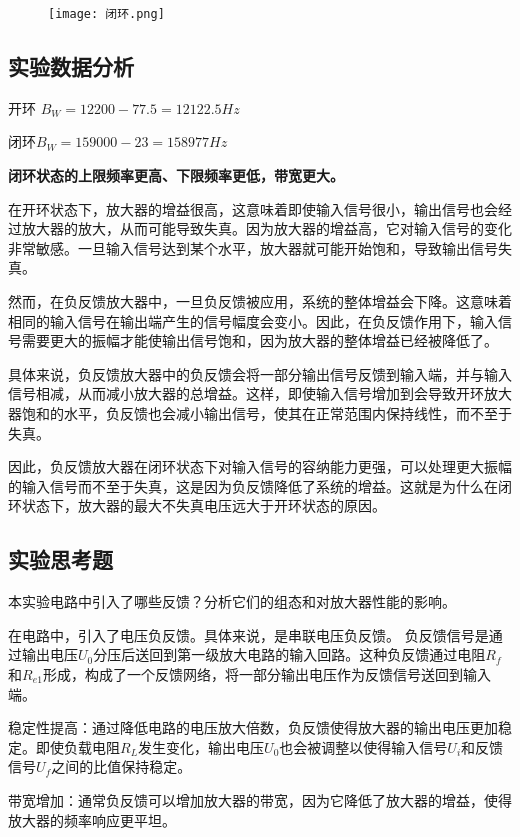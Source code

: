 \documentclass[dvipsnames, svgnames,a4paper,11pt]{article}
\begin{document}
	\begin{figure}[{H}]
		\centering
		\texttt{[image: 闭环.png]}
		
		\label{}
	\end{figure}
	\subsection{实验数据分析}
	开环 $B_W=12200-77.5=12122.5Hz$

闭环$B_W=159000-23=158977Hz$

\textbf{闭环状态的上限频率更高、下限频率更低，带宽更大。
}

在开环状态下，放大器的增益很高，这意味着即使输入信号很小，输出信号也会经过放大器的放大，从而可能导致失真。因为放大器的增益高，它对输入信号的变化非常敏感。一旦输入信号达到某个水平，放大器就可能开始饱和，导致输出信号失真。

然而，在负反馈放大器中，一旦负反馈被应用，系统的整体增益会下降。这意味着相同的输入信号在输出端产生的信号幅度会变小。因此，在负反馈作用下，输入信号需要更大的振幅才能使输出信号饱和，因为放大器的整体增益已经被降低了。

具体来说，负反馈放大器中的负反馈会将一部分输出信号反馈到输入端，并与输入信号相减，从而减小放大器的总增益。这样，即使输入信号增加到会导致开环放大器饱和的水平，负反馈也会减小输出信号，使其在正常范围内保持线性，而不至于失真。

因此，负反馈放大器在闭环状态下对输入信号的容纳能力更强，可以处理更大振幅的输入信号而不至于失真，这是因为负反馈降低了系统的增益。这就是为什么在闭环状态下，放大器的最大不失真电压远大于开环状态的原因。

\subsection{实验思考题}
	
	\begin{question}
		本实验电路中引入了哪些反馈？分析它们的组态和对放大器性能的影响。
	\end{question}
	在电路中，引入了电压负反馈。具体来说，是串联电压负反馈。
负反馈信号是通过输出电压$U_0$分压后送回到第一级放大电路的输入回路。这种负反馈通过电阻$R_f$和$R_{e1}$形成，构成了一个反馈网络，将一部分输出电压作为反馈信号送回到输入端。

稳定性提高：通过降低电路的电压放大倍数，负反馈使得放大器的输出电压更加稳定。即使负载电阻$R_L$发生变化，输出电压$U_0$也会被调整以使得输入信号$U_i$和反馈信号$U_f$之间的比值保持稳定。

带宽增加：通常负反馈可以增加放大器的带宽，因为它降低了放大器的增益，使得放大器的频率响应更平坦。
\end{document}
